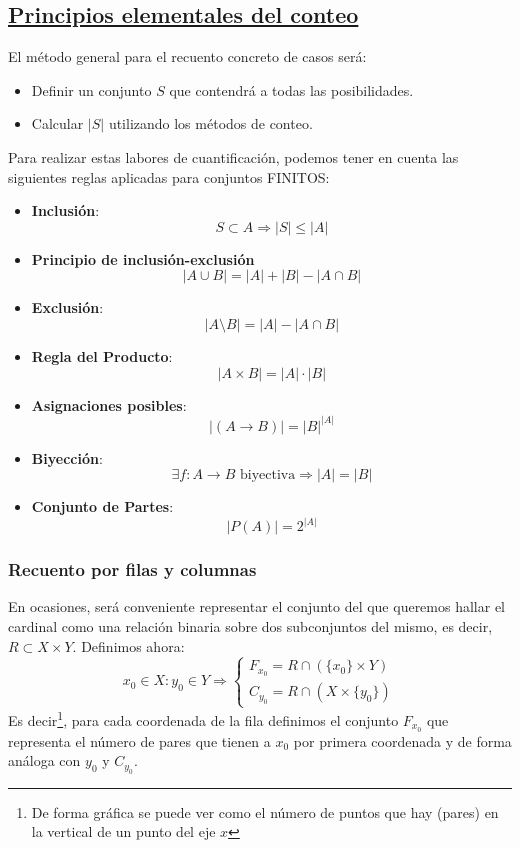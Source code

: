 \documentclass[10pt,a4paper,openright]{book}
\begin{document}
\subsection*{\underline{Principios elementales del conteo}}
El método general para el recuento concreto de casos será:
\begin{itemize}
\item Definir un conjunto $S$ que contendrá a todas las posibilidades.
\item Calcular $|S|$ utilizando los métodos de conteo.
\end{itemize}

Para realizar estas labores de cuantificación, podemos tener en cuenta las siguientes reglas aplicadas para conjuntos FINITOS:
\begin{itemize}
\item \textbf{Inclusión}:
$$S\subset A\Rightarrow |S|\leq |A|$$
\item \textbf{Principio de inclusión-exclusión}
$$|A\cup B|=|A|+|B|-|A\cap B|$$
\item \textbf{Exclusión}:
$$|A\mbox{\textbackslash}B|=|A|-|A\cap B|$$
\item \textbf{Regla del Producto}:
$$|A\times B| = |A|\cdot |B|$$
\item \textbf{Asignaciones posibles}:
$$|(A\rightarrow B)|=|B|^{|A|}$$
\item \textbf{Biyección}:
$$\exists f: A\rightarrow B \mbox{ biyectiva}\Rightarrow |A|=|B|$$
\item \textbf{Conjunto de Partes}:
$$|P(A)|=2^{|A|}$$
\end{itemize}

\subsubsection*{Recuento por filas y columnas}
En ocasiones, será conveniente representar el conjunto del que queremos hallar el cardinal como una relación binaria sobre dos subconjuntos del mismo, es decir, $R\subset X\times Y$. Definimos ahora:
$$x_0\in X: y_0\in Y\Rightarrow \begin{cases}F_{x_0} = R\cap (\{x_0\}\times Y) \\ C_{y_0} = R\cap (X\times \{y_0\})\end{cases}$$
Es decir\footnote{De forma gráfica se puede ver como el número de puntos que hay (pares) en la vertical de un punto del eje $x$}, para cada coordenada de la fila definimos el conjunto $F_{x_0}$ que representa el número de pares que tienen a $x_0$ por primera coordenada y de forma análoga con $y_0$ y $C_{y_0}$.
\end{document}
